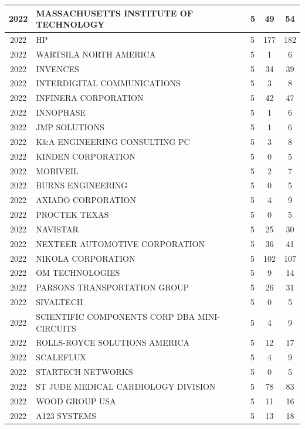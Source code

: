 \documentclass{article}%
\begin{document}
\begin{longtable}{c|p{20em}|p{5em}|c|c}
\hline%
2022&MASSACHUSETTS INSTITUTE OF TECHNOLOGY&5&49&54\\%
\hline%
2022&HP&5&177&182\\%
\hline%
2022&WARTSILA NORTH AMERICA&5&1&6\\%
\hline%
2022&INVENCES&5&34&39\\%
\hline%
2022&INTERDIGITAL COMMUNICATIONS&5&3&8\\%
\hline%
2022&INFINERA CORPORATION&5&42&47\\%
\hline%
2022&INNOPHASE&5&1&6\\%
\hline%
2022&JMP SOLUTIONS&5&1&6\\%
\hline%
2022&K\&A ENGINEERING CONSULTING PC&5&3&8\\%
\hline%
2022&KINDEN CORPORATION&5&0&5\\%
\hline%
2022&MOBIVEIL&5&2&7\\%
\hline%
2022&BURNS ENGINEERING&5&0&5\\%
\hline%
2022&AXIADO CORPORATION&5&4&9\\%
\hline%
2022&PROCTEK TEXAS&5&0&5\\%
\hline%
2022&NAVISTAR&5&25&30\\%
\hline%
2022&NEXTEER AUTOMOTIVE CORPORATION&5&36&41\\%
\hline%
2022&NIKOLA CORPORATION&5&102&107\\%
\hline%
2022&OM TECHNOLOGIES&5&9&14\\%
\hline%
2022&PARSONS TRANSPORTATION GROUP&5&26&31\\%
\hline%
2022&SIVALTECH&5&0&5\\%
\hline%
2022&SCIENTIFIC COMPONENTS CORP DBA MINI{-}CIRCUITS&5&4&9\\%
\hline%
2022&ROLLS{-}ROYCE SOLUTIONS AMERICA&5&12&17\\%
\hline%
2022&SCALEFLUX&5&4&9\\%
\hline%
2022&STARTECH NETWORKS&5&0&5\\%
\hline%
2022&ST JUDE MEDICAL CARDIOLOGY DIVISION&5&78&83\\%
\hline%
2022&WOOD GROUP USA&5&11&16\\%
\hline%
2022&A123 SYSTEMS&5&13&18\\%
\hline%
\end{longtable}

%
\newpage%
\end{document}
